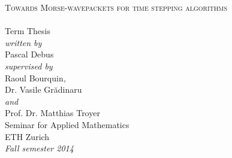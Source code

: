 \begin{titlepage}
\begin{center}
  \hfill
  \vspace{3.0cm}

  {\huge \textsc{Towards Morse-wavepackets for time stepping algorithms\\[10pt]
  }}
  ~\\[20pt]

  {\huge{Term Thesis}}\\[2.5cm]

  {\emph{written by}}\\
  Pascal Debus
  \\[0.6cm]
  {\emph{supervised by}}\\
  Raoul Bourquin{\emph{,}}\\
  Dr. Vasile Gr\u{a}dinaru\\
  {\emph{and}}\\
  Prof. Dr. Matthias Troyer
  \\[2.5cm]

  Seminar for Applied Mathematics\\
  ETH Zurich
  \\[0.5cm]
  \emph{{Fall semester 2014}}
\end{center}
\end{titlepage}
